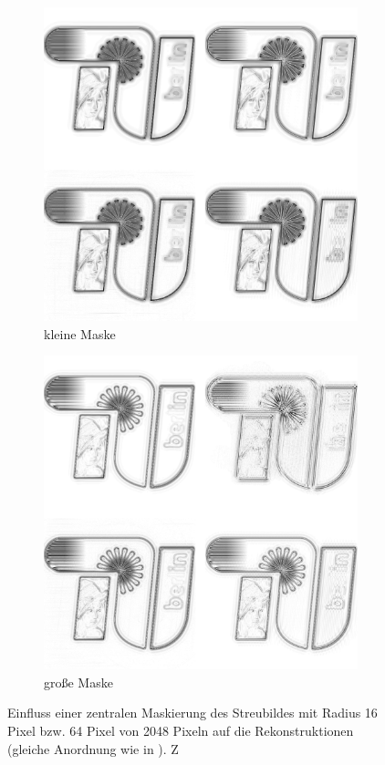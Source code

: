 \begin{figure}

	\begin{subfigure}[b]{0.48\textwidth}
		\includegraphics[width=\textwidth]{images/recon2d-mask16.png}
		\caption{kleine Maske}
	\end{subfigure}
	\hspace*{\fill}
	\begin{subfigure}[b]{0.48\textwidth}
		\includegraphics[width=\textwidth]{images/recon2d-mask64.png}
		\caption{große Maske}	
	\end{subfigure}
	\caption[2D Rekonstruktion: Beamstop]{Einfluss einer zentralen Maskierung des Streubildes mit Radius 16 Pixel bzw. 64 Pixel von 2048 Pixeln auf die Rekonstruktionen (gleiche Anordnung wie in ). Z}
	\label{fig:recon2d-mask}
\end{figure}

